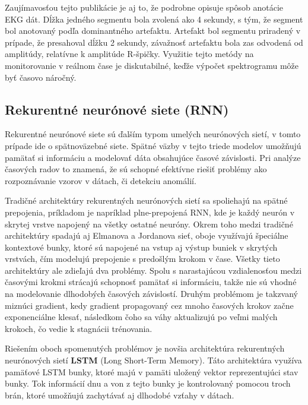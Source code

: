 Zaujímavosťou tejto publikácie je aj to, že podrobne opisuje spôsob anotácie EKG dát. Dĺžka jedného segmentu bola zvolená ako 4 sekundy, s tým, že segment bol anotovaný podľa dominantného artefaktu. Artefakt bol segmentu priradený v prípade, že presahoval dĺžku 2 sekundy, závažnosť artefaktu bola zas odvodená od amplitúdy, relatívne k amplitúde R-špičky. \cite{Zhang2019} Využitie tejto metódy na monitorovanie v reálnom čase je diskutabilné, keďže výpočet spektrogramu môže byť časovo náročný.

\subsection{Rekurentné neurónové siete (RNN)}

Rekurentné neurónové siete sú ďalším typom umelých neurónových sietí, v tomto prípade ide o spätnoväzebné siete. Spätné väzby v tejto triede modelov umožňujú pamätať si informáciu a modelovať dáta obsahujúce časové závislosti. Pri analýze časových radov to znamená, že sú schopné efektívne riešiť problémy ako rozpoznávanie vzorov v dátach, či detekciu anomálií. 

Tradičné architektúry rekurentných neurónových sietí sa spoliehajú na spätné prepojenia, príkladom je napríklad plne-prepojená RNN, kde je každý neurón v skrytej vrstve napojený na všetky ostatné neuróny. Okrem toho medzi tradičné architektúry spadajú aj Elmanova a Jordanova sieť, oboje využívajú špeciálne kontextové bunky, ktoré sú napojené na vstup aj výstup buniek v skrytých vrstvách, čím modelujú prepojenie s predošlým krokom v čase. Všetky tieto architektúry ale zdieľajú dva problémy. Spolu s narastajúcou vzdialenosťou medzi časovými krokmi strácajú schopnosť pamätať si informáciu, takže nie sú vhodné na modelovanie dlhodobých časových závislostí.\cite{Staudemeyer2019} Druhým problémom je takzvaný miznúci gradient, kedy gradient propagovaný cez mnoho časových krokov začne exponenciálne klesať, následkom čoho sa váhy aktualizujú po veľmi malých krokoch, čo vedie k stagnácii trénovania.\cite{Hochreiter1998}   

Riešením oboch spomenutých problémov je novšia architektúra rekurentných neurónových sietí \textbf{LSTM} (Long Short-Term Memory). Táto architektúra využíva pamäťové LSTM bunky, ktoré majú v pamäti uložený vektor reprezentujúci stav bunky. Tok informácií dnu a von z tejto bunky je kontrolovaný pomocou troch brán, ktoré umožňujú zachytávať aj dlhodobé vzťahy v dátach.

